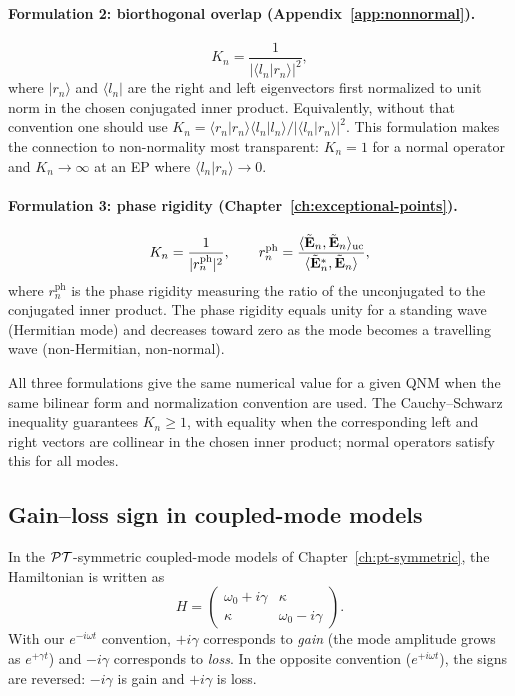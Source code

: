 \paragraph{Formulation 2: biorthogonal overlap
(Appendix~\ref{app:nonnormal}).}
\begin{equation}
 K_n = \frac{1}{|\langle l_n | r_n \rangle|^2},
 \label{eq:petermann-form2}
\end{equation}
where $|r_n\rangle$ and $\langle l_n|$ are the right and left
eigenvectors first normalized to unit norm in the chosen conjugated
inner product. Equivalently, without that convention one should use
$K_n=\langle r_n|r_n\rangle\langle l_n|l_n\rangle/
|\langle l_n|r_n\rangle|^2$. This formulation makes the
connection to non-normality most transparent: $K_n = 1$ for a normal
operator and $K_n \to \infty$ at an EP where
$\langle l_n | r_n \rangle \to 0$.

\paragraph{Formulation 3: phase rigidity
(Chapter~\ref{ch:exceptional-points}).}
\begin{equation}
 K_n = \frac{1}{|r_n^{\mathrm{ph}}|^2},
 \qquad
 r_n^{\mathrm{ph}} = \frac{\langle \tilde{\mathbf{E}}_n, \tilde{\mathbf{E}}_n
 \rangle_{\mathrm{uc}}}
 {\langle \tilde{\mathbf{E}}_n^*, \tilde{\mathbf{E}}_n \rangle},
 \label{eq:petermann-form3}
\end{equation}
where $r_n^{\mathrm{ph}}$ is the phase rigidity measuring the ratio of
the unconjugated to the conjugated inner product. The phase rigidity
equals unity for a standing wave (Hermitian mode) and decreases toward
zero as the mode becomes a travelling wave (non-Hermitian, non-normal).

All three formulations give the same numerical value for a given QNM
when the same bilinear form and normalization convention are used. The
Cauchy--Schwarz inequality guarantees $K_n \ge 1$, with equality when
the corresponding left and right vectors are collinear in the chosen
inner product; normal operators satisfy this for all modes.

\subsection{Gain--loss sign in coupled-mode models}
\label{ssec:gain-loss-sign}

In the $\mathcal{PT}$-symmetric coupled-mode models of
Chapter~\ref{ch:pt-symmetric}, the Hamiltonian is written as
\begin{equation}
 H = \begin{pmatrix}
 \omega_0 + i\gamma & \kappa \\
 \kappa & \omega_0 - i\gamma
 \end{pmatrix}.
 \label{eq:pt-hamiltonian-convention}
\end{equation}
With our $e^{-i\omega t}$ convention, $+i\gamma$ corresponds to
\emph{gain} (the mode amplitude grows as $e^{+\gamma t}$) and
$-i\gamma$ corresponds to \emph{loss}. In the opposite convention
($e^{+i\omega t}$), the signs are reversed: $-i\gamma$ is gain and
$+i\gamma$ is loss.

